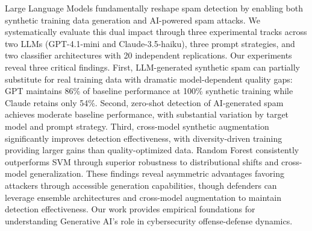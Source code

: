 \label{sec:abstract}
Large Language Models fundamentally reshape spam detection by enabling both synthetic training data generation and AI-powered spam attacks. We systematically evaluate this dual impact through three experimental tracks across two LLMs (GPT-4.1-mini and Claude-3.5-haiku), three prompt strategies, and two classifier architectures with 20 independent replications. Our experiments reveal three critical findings. First, LLM-generated synthetic spam can partially substitute for real training data with dramatic model-dependent quality gaps: GPT maintains 86\% of baseline performance at 100\% synthetic training while Claude retains only 54\%. Second, zero-shot detection of AI-generated spam achieves moderate baseline performance, with substantial variation by target model and prompt strategy. Third, cross-model synthetic augmentation significantly improves detection effectiveness, with diversity-driven training providing larger gains than quality-optimized data. Random Forest consistently outperforms SVM through superior robustness to distributional shifts and cross-model generalization. These findings reveal asymmetric advantages favoring attackers through accessible generation capabilities, though defenders can leverage ensemble architectures and cross-model augmentation to maintain detection effectiveness. Our work provides empirical foundations for understanding Generative AI's role in cybersecurity offense-defense dynamics.
